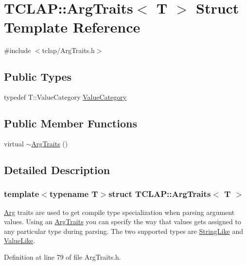 \hypertarget{struct_t_c_l_a_p_1_1_arg_traits}{}\section{T\+C\+L\+A\+P\+:\+:Arg\+Traits$<$ T $>$ Struct Template Reference}
\label{struct_t_c_l_a_p_1_1_arg_traits}


{\ttfamily \#include $<$tclap/\+Arg\+Traits.\+h$>$}

\subsection*{Public Types}
\begin{DoxyCompactItemize}
\item 
typedef T\+::\+Value\+Category \hyperlink{struct_t_c_l_a_p_1_1_arg_traits_a346532973520fc820d6b3e5406dfa8f6}{Value\+Category}
\end{DoxyCompactItemize}
\subsection*{Public Member Functions}
\begin{DoxyCompactItemize}
\item 
virtual \hyperlink{struct_t_c_l_a_p_1_1_arg_traits_abbf8fe38dc8c0e0d179509cef1cf89e7}{$\sim$\+Arg\+Traits} ()
\end{DoxyCompactItemize}


\subsection{Detailed Description}
\subsubsection*{template$<$typename T$>$struct T\+C\+L\+A\+P\+::\+Arg\+Traits$<$ T $>$}

\hyperlink{class_t_c_l_a_p_1_1_arg}{Arg} traits are used to get compile type specialization when parsing argument values. Using an \hyperlink{struct_t_c_l_a_p_1_1_arg_traits}{Arg\+Traits} you can specify the way that values gets assigned to any particular type during parsing. The two supported types are \hyperlink{struct_t_c_l_a_p_1_1_string_like}{String\+Like} and \hyperlink{struct_t_c_l_a_p_1_1_value_like}{Value\+Like}. 

Definition at line 79 of file Arg\+Traits.\+h.



